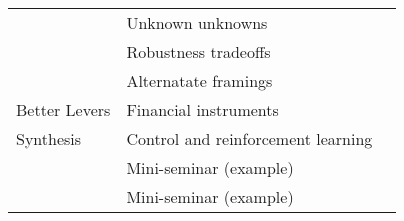 \documentclass[nobib]{tufte-handout}
\begin{document}
\begin{fullwidth}
\begin{tabular}{R{1in} L{3in} L{2.5in}}
		                 & Unknown unknowns                              & \citet{taleb_blackswan:2007}                                    \\
		                 & Robustness tradeoffs                          & \citet{anderies_panaceas:2007}                                  \\
		                 & Alternatate framings                          & \citet{doss-gollin_sequential:2020}                             \\
		Better Levers    & Financial instruments                         & \citet{hamilton_snowpack:2020}                                  \\
		Synthesis        & Control and reinforcement learning            & \citet{herman_control:2020}                                     \\
		                 & Mini-seminar (example)                        & \citet{Zeff:2016hx}                                             \\
		                 & Mini-seminar (example)                        & \citet{Poff:2015jn}                                             \\
	\end{tabular}
\end{fullwidth}



\printbibliography
\end{document}

